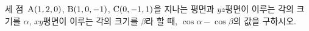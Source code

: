 세 점~$\mathrm{A}(1{,}\mkern3mu\mathopen{}2{,}\mkern3mu\mathopen{}0)$, $\mathrm{B}(1{,}\mkern3mu\mathopen{}0{,}\mkern3mu\mathopen{}-1)$, $\mathrm{C}(0{,}\mkern3mu\mathopen{}-1{,}\mkern3mu\mathopen{}1)$을 지나는 평면과 $yz$평면이 이루는 각의 크기를 $\alpha$, $xy$평면이 이루는 각의 크기를 $\beta$라 할 때, $\cos\alpha-\cos\beta$의 값을 구하시오.

